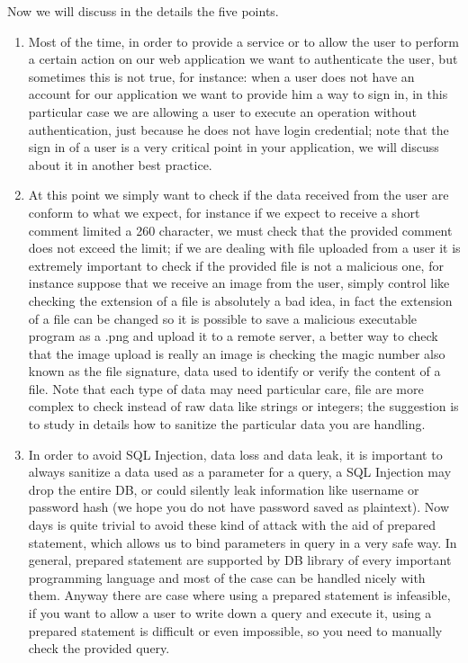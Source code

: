 Now we will discuss in the details the five points.\newline

\begin{enumerate}
	\item	Most of the time, in order to provide a service or to allow the user to perform a certain action on our web application we want to authenticate the user, but sometimes this is not true, for instance: when a user does not have an account for our application we want to provide him a way to sign in, in this particular case we are allowing a user to execute an operation without authentication, just because he does not have login credential; note that the sign in of a user is a very critical point in your application, we will discuss about it in another best practice.
	\item At this point we simply want to check if the data received from the user are conform to what we expect, for instance if we expect to receive a short comment limited a 260 character, we must check that the provided comment does not exceed the limit; if we are dealing with file uploaded from a user it is extremely important to check if the provided file is not a malicious one, for instance suppose that we receive an image from the user, simply control like checking the extension of a file is absolutely a bad idea, in fact the extension of a file can be changed so it is possible to save a malicious executable program as a .png and upload it to a remote server, a better way to check that the image upload is really an image is checking the magic number also known as the file signature, data used to identify or verify the content of a file.
	Note that each type of data may need particular care, file are more complex to check instead of raw data like strings or integers; the suggestion is to study in details how to sanitize the particular data you are handling.
	\item In order to avoid SQL Injection, data loss and data leak, it is important to always sanitize a data used as a parameter for a query, a SQL Injection may drop the entire DB, or could silently leak information like username or password hash (we hope you do not have password saved as plaintext). Now days is quite trivial to avoid these kind of attack with the aid of prepared statement, which allows us to bind parameters in query in a very safe way.
	In general, prepared statement are supported by DB library of every important programming language and most of the case can be handled nicely with them.
	Anyway there are case where using a prepared statement is infeasible, if you want to allow a user to write down a query and execute it, using a prepared statement is difficult or even impossible, so you need to manually check the provided query.

\end{enumerate}
